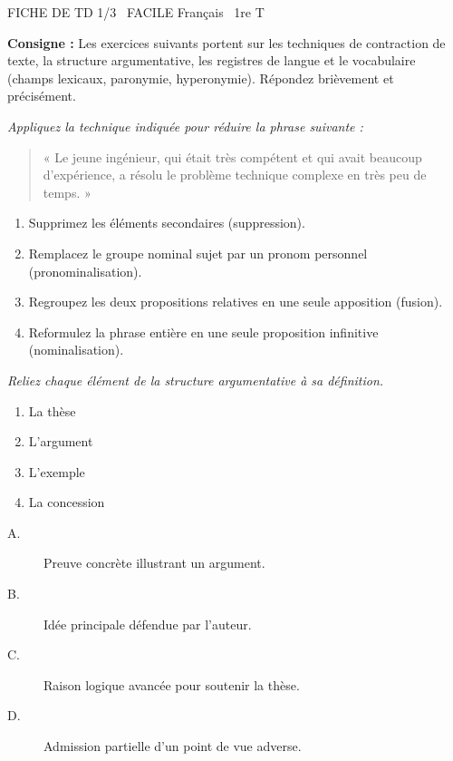 \documentclass[11pt]{article}
\begin{document}
\begin{tcolorbox}[enhanced,colback=popink,colframe=popink,arc=10pt,boxrule=0pt,left=12pt,right=12pt,top=9pt,bottom=9pt]
{\color{white}\popxbold\small FICHE DE TD 1/3 \textbullet\ FACILE \hfill Français \textbullet\ 1re T\par}
\end{tcolorbox}
\vspace{4pt}
\noindent \textbf{Consigne :} Les exercices suivants portent sur les techniques de contraction de texte, la structure argumentative, les registres de langue et le vocabulaire (champs lexicaux, paronymie, hyperonymie). Répondez brièvement et précisément.

\begin{exercice}
\emph{Appliquez la technique indiquée pour réduire la phrase suivante :}
\begin{quote}
« Le jeune ingénieur, qui était très compétent et qui avait beaucoup d'expérience, a résolu le problème technique complexe en très peu de temps. »
\end{quote}
\begin{enumerate}
    \item Supprimez les éléments secondaires (suppression).
    \item Remplacez le groupe nominal sujet par un pronom personnel (pronominalisation).
    \item Regroupez les deux propositions relatives en une seule apposition (fusion).
    \item Reformulez la phrase entière en une seule proposition infinitive (nominalisation).
\end{enumerate}
\end{exercice}

\begin{exercice}
\emph{Reliez chaque élément de la structure argumentative à sa définition.}
\begin{enumerate}
    \item La thèse
    \item L'argument
    \item L'exemple
    \item La concession
\end{enumerate}
\begin{description}
    \item[A.] Preuve concrète illustrant un argument.
    \item[B.] Idée principale défendue par l'auteur.
    \item[C.] Raison logique avancée pour soutenir la thèse.
    \item[D.] Admission partielle d'un point de vue adverse.
\end{description}
\end{exercice}
\end{document}
